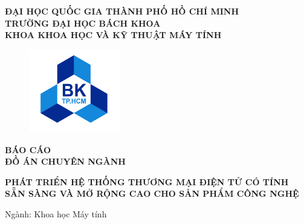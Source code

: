 \begin{titlepage}

    \begingroup
        \fontsize{15pt}{12pt}\selectfont
        \begin{center}
            \textbf{
                ĐẠI HỌC QUỐC GIA THÀNH PHỐ HỒ CHÍ MINH \\
                TRƯỜNG ĐẠI HỌC BÁCH KHOA \\
                KHOA KHOA HỌC VÀ KỸ THUẬT MÁY TÍNH
            }
        \end{center}       
    \endgroup
    
    \vspace{1cm}
    
    \begin{figure}[h!]
        \begin{center}
            \includegraphics[width=4cm]{images/hcmut.png}
        \end{center}
    \end{figure}
    
    \vspace{0.5cm}

    \begingroup
        \fontsize{15pt}{12pt}\selectfont
        \begin{center}
            \textbf{BÁO CÁO} \\
            \textbf{ĐỒ ÁN CHUYÊN NGÀNH}
        \end{center}       
    \endgroup

    \vspace{0.5cm}


    \begingroup
        \fontsize{18pt}{12pt}\selectfont
        \begin{center}
            \textbf{PHÁT TRIỂN HỆ THỐNG THƯƠNG MẠI ĐIỆN TỬ CÓ TÍNH SẴN SÀNG VÀ MỞ RỘNG CAO CHO SẢN PHẨM CÔNG NGHỆ}
        \end{center}       
    \endgroup

    \vspace{0.5cm}

    \begingroup
        \fontsize{15pt}{12pt}\selectfont
        \begin{center}
            Ngành: Khoa học Máy tính
        \end{center}       
    \endgroup
    

\end{titlepage}
